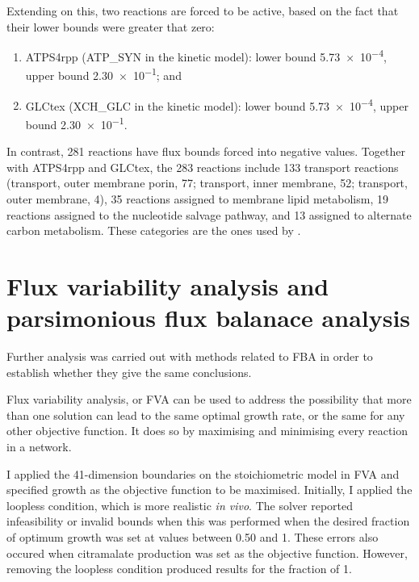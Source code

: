 \documentclass[parskip=full, numbers=noenddot]{scrreprt}
\begin{document}
Extending on this, two reactions are forced to be active, based on the fact that their lower bounds were greater that zero:
\begin{enumerate}
\item ATPS4rpp (ATP\_SYN in the kinetic model): lower bound \num{5.73e-4}, upper bound \num{2.30e-1}; and
  \item GLCtex (XCH\_GLC in the kinetic model): lower bound \num{5.73e-4}, upper bound \num{2.30e-1}.
  \end{enumerate}

  In contrast, 281 reactions have flux bounds forced into negative values. Together with ATPS4rpp and GLCtex, the 283 reactions include 133 transport reactions (transport, outer membrane porin, 77; transport, inner membrane, 52; transport, outer membrane, 4), 35 reactions assigned to membrane lipid metabolism, 19 reactions assigned to the nucleotide salvage pathway, and 13 assigned to alternate carbon metabolism. These categories are the ones used by \citet{orth_comprehensive_2011}.

  \section{Flux variability analysis and parsimonious flux balanace analysis}
  \label{sec:fva}

Further analysis was carried out with methods related to FBA in order to establish whether they give the same conclusions.

Flux variability analysis, or FVA \citep{orth_what_2010} can be used to address the possibility that more than one solution can lead to the same optimal growth rate, or the same for any other objective function. It does so by maximising and minimising every reaction in a network.

I applied the 41-dimension boundaries on the stoichiometric model in FVA and specified growth as the objective function to be maximised. Initially, I applied the loopless condition, which is more realistic \emph{in vivo}. The solver reported infeasibility or invalid bounds when this was performed when the desired fraction of optimum growth was set at values between 0.50 and 1. These errors also occured when citramalate production was set as the objective function. However, removing the loopless condition produced results for the fraction of 1.
\end{document}
